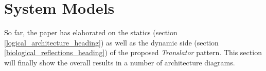 %
%
%
%
%
%
%

\section{System Models}
\label{system_models_heading}

So far, the paper has elaborated on the statics (section \ref{logical_architecture_heading})
as well as the dynamic side (section \ref{biological_reflections_heading}) of the
proposed \emph{Translator} pattern.
This section will finally show the overall results in a number of architecture
diagrams.





